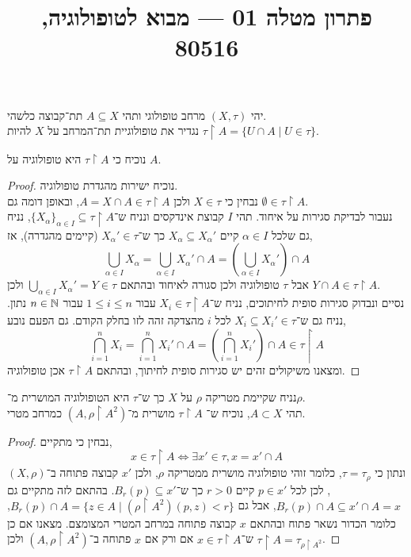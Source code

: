 
\title{פתרון מטלה 01 --- מבוא לטופולוגיה, 80516}


\maketitle
\maketitleprint{}

\question{}
יהי $(X, \tau)$ מרחב טופולוגי ותהי $A \subseteq X$ תת־קבוצה כלשהי. \\
נגדיר את טופולוגיית תת־המרחב על $X$ להיות $\tau \restriction A = \{ U \cap A \mid U \in \tau \}$.

\subquestion{}
נוכיח כי $\tau \restriction A$ היא טופולוגיה על $A$.
\begin{proof}
	נוכיח ישירות מהגדרת טופולוגיה. \\
	נבחין כי $X \in \tau$ ולכן $A = X \cap A \in \tau \restriction A$, ובאופן דומה גם $\emptyset \in \tau \restriction A$. \\
	נעבור לבדיקת סגירות על איחוד.
	תהי $I$ קבוצת אינדקסים ונניח ש־${\{ X_\alpha \}}_{\alpha \in I} \subseteq \tau \restriction A$, נניח גם שלכל $\alpha \in I$ קיים $X_\alpha \subseteq X_\alpha'$ כך ש־$X_\alpha' \in \tau$ (קיימים מהגדרה), אז,
	\[
		\bigcup_{\alpha \in I} X_\alpha
		= \bigcup_{\alpha \in I} X_\alpha' \cap A
		= \left( \bigcup_{\alpha \in I} X_\alpha' \right) \cap A
	\]
	אבל $\tau$ טופולוגיה ולכן סגורה לאיחוד ובהתאם $\bigcup_{\alpha \in I} X_\alpha' = Y \in \tau$ ולכן $Y \cap A \in \tau \restriction A$. \\
	נסיים ונבדוק סגירות סופית לחיתוכים, נניח ש־$X_i \in \tau \restriction A$ עבור $1 \le i \le n$ עבור $n \in \mathbb{N}$ נתון.
	נניח גם ש־$X_i \subseteq X_i' \in \tau$ לכל $i$ מהצדקה זהה לזו בחלק הקודם.
	גם הפעם נובע,
	\[
		\bigcap_{i = 1}^n X_i
		= \bigcap_{i = 1}^n X_i' \cap A
		= \left( \bigcap_{i = 1}^n X_i' \right) \cap A
		\in \tau \restriction A
	\]
	ומצאנו משיקולים זהים יש סגירות סופית לחיתוך, ובהתאם $\tau \restriction A$ אכן טופולוגיה.
\end{proof}

\subquestion{}
נניח שקיימת מטריקה $\rho$ על $X$ כך ש־$\tau$ היא הטופולוגיה המושרית מ־$\rho$. \\
תהי $A \subset X$, נוכיח ש־ $\tau \restriction A$ מושרית מ־$(A, \rho \restriction A^2)$ כמרחב מטרי.
\begin{proof}
	נבחין כי מתקיים,
	\[
		x \in \tau \restriction A
		\iff \exists x' \in \tau, x = x' \cap A
	\]
	ונתון כי $\tau = \tau_\rho$, כלומר זוהי טופולוגיה מושרית ממטריקה $\rho$,
	ולכן $x'$ קבוצה פתוחה ב־$(X, \rho)$, לכן לכל $p \in x'$ קיים $r > 0$ כך ש־$B_r(p) \subseteq x'$.
	בהתאם לזה מתקיים גם $B_r(p) \cap A \subseteq x' \cap A = x$, אבל גם $B_r(p) \cap A = \{ z \in A \mid (\rho \restriction A^2)(p, z) < r \}$, כלומר הכדור נשאר פתוח ובהתאם $x$ קבוצה פתוחה במרחב המטרי המצומצם.
	מצאנו אם כן ש־$x \in \tau \restriction A$ אם ורק אם $x$ פתוחה ב־$(A, \rho \restriction A^2)$ ולכן $\tau \restriction A = \tau_{\rho \restriction A^2}$.
\end{proof}

